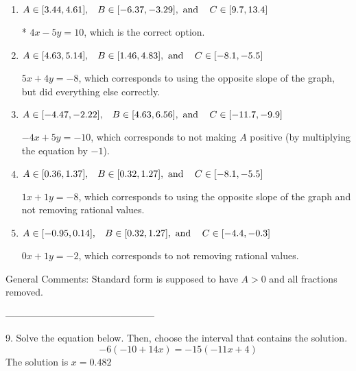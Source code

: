 \documentclass{article}[14pt]
\begin{document}
\begin{enumerate}[label=\Alph*.] 
\item $ A \in [3.44, 4.61], \hspace{3mm} B \in [-6.37, -3.29], \text{ and } \hspace{3mm} C \in [9.7, 13.4] $ 

 * $4x - 5y = 10$, which is the correct option. 
\item $ A \in [4.63, 5.14], \hspace{3mm} B \in [1.46, 4.83], \text{ and } \hspace{3mm} C \in [-8.1, -5.5] $ 

  $5x + 4y = -8$, which corresponds to using the opposite slope of the graph, but did everything else correctly. 
\item $ A \in [-4.47, -2.22], \hspace{3mm} B \in [4.63, 6.56], \text{ and } \hspace{3mm} C \in [-11.7, -9.9] $ 

  $-4x + 5y = -10$, which corresponds to not making $A$ positive (by multiplying the equation by $-1$). 
\item $ A \in [0.36, 1.37], \hspace{3mm} B \in [0.32, 1.27], \text{ and } \hspace{3mm} C \in [-8.1, -5.5] $ 

  $1x + 1y = -8$, which corresponds to using the opposite slope of the graph and not removing rational values. 
\item $ A \in [-0.95, 0.14], \hspace{3mm} B \in [0.32, 1.27], \text{ and } \hspace{3mm} C \in [-4.4, -0.3] $ 

  $0x + 1y = -2$, which corresponds to not removing rational values. 
\end{enumerate} 
 
General Comments: Standard form is supposed to have $A > 0$ and all fractions removed.

-----------------------------------------------

9. Solve the equation below. Then, choose the interval that contains the solution.
$$ -6(-10+14 x) = -15(-11 x+4) $$ 
The solution is $ x = 0.482 $ 
\end{document}
